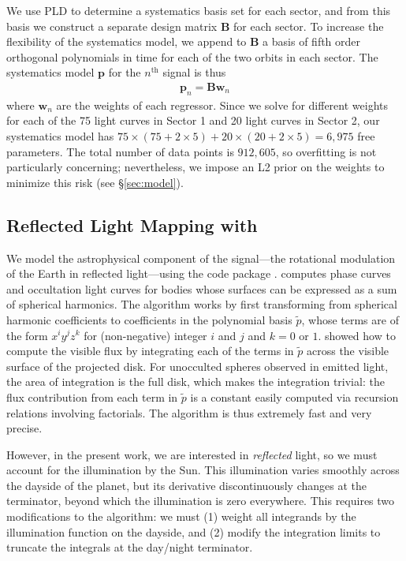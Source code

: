 \documentclass[modern]{aastex62}
\begin{document}
We use PLD to determine a systematics basis set for each \TESS sector, and
from this basis we construct a separate design matrix $\mathbf{B}$ for each sector. To
increase the flexibility of the systematics model, we append to $\mathbf{B}$ a basis of
fifth order orthogonal polynomials in time for each of the two orbits in each sector.
The systematics model $\mathbf{p}$ for the $n^\mathrm{th}$ signal is thus
%
\begin{align}
\mathbf{p}_n = \mathbf{B} \mathbf{w}_n
\end{align}
%
where $\mathbf{w}_n$ are the weights of each regressor.
Since we solve for different weights for each of the 75 light curves in Sector 1
and 20 light curves in Sector 2, our systematics model has
$75 \times (75 + 2 \times 5) + 20 \times (20 + 2 \times 5) = 6,975$ free parameters.
The total number of data points is $912,605$, so overfitting is not particularly
concerning; nevertheless, we impose an L2 prior on the weights to minimize this risk
(see \S\ref{sec:model}).

\subsection{Reflected Light Mapping with \starry}
\label{sec:starry}

We model the astrophysical component of the signal---the rotational modulation
of the Earth in reflected light---using the \starry code package \citep{Luger2019}.
\starry computes phase curves and occultation light curves for bodies whose
surfaces can be expressed as a sum of spherical harmonics. 
The algorithm works by first transforming
from spherical harmonic coefficients to coefficients in the polynomial basis $\tilde{p}$, whose
terms are of the form $x^i y^j z^k$ for (non-negative) integer $i$ and $j$ 
and $k = 0$ or $1$. \citet{Luger2019} showed how to compute the visible
flux by integrating each of the terms in $\tilde{p}$ across the visible
surface of the projected disk. For unocculted spheres observed in emitted
light, the area of integration is the full disk, which makes the integration
trivial: the flux contribution from each term in $\tilde{p}$ is a constant
easily computed via recursion relations involving factorials. The algorithm is
thus extremely fast and very precise.

However, in the present work, we are interested in \emph{reflected} light, so we must
account for the illumination by the Sun. This illumination varies smoothly
across the dayside of the planet, but its derivative discontinuously changes at the 
terminator, beyond which the illumination is zero everywhere. This requires
two modifications to the \starry algorithm: we must (1) weight all integrands
by the illumination function on the dayside, and (2) modify the integration
limits to truncate the integrals at the day/night terminator.
\end{document}
